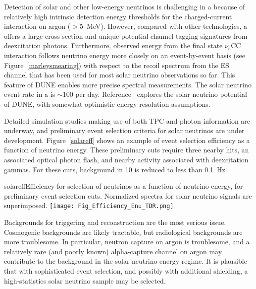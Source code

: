 Detection of solar and other low-energy neutrinos is challenging in
a  because of relatively high intrinsic detection energy thresholds for
the charged-current interaction on argon ($>$\SI{5}{\MeV}). 
However, compared with other technologies, a  offers a large
cross section and unique potential channel-tagging signatures from deexcitation
photons.  Furthermore, observed energy from the final state $\nu_e$CC
interaction follows neutrino energy more closely on an event-by-event
basis (see Figure~\ref{marleysmearing}) with respect to the recoil
spectrum from the ES channel that has been used for most solar neutrino
observations so far. This feature of DUNE enables more precise spectral measurements.
The solar neutrino event rate in a
  is $\sim$100 per day.
Reference~\cite{Capozzi:2018dat} explores the solar neutrino potential
of DUNE, with somewhat optimistic energy resolution assumptions.

Detailed simulation studies
making use of both TPC and photon information are underway, and
preliminary event selection criteria for solar neutrinos are under development.
Figure~\ref{solareff} shows an example of event selection efficiency
as a function of neutrino energy.  These preliminary cuts require three nearby
 hits, an associated optical photon flash, and nearby
 activity associated with deexcitation gammas.  For these
cuts,
background in \SI{10}{\kt} is reduced to less than \SI{0.1}{Hz}.

\begin{dunefigure}{solareff}{Efficiency for
  selection of neutrinos as a function of neutrino energy, for
  preliminary event selection cuts.
  Normalized spectra for solar neutrino signals are superimposed. }
\texttt{[image: Fig\_Efficiency\_Enu\_TDR.png]}
\end{dunefigure}

Backgrounds for triggering and reconstruction are the most
serious issue.  Cosmogenic backgrounds are likely tractable, but
radiological backgrounds are more troublesome.  In particular, neutron
capture on argon is troublesome, and a relatively rare (and poorly
known) alpha-capture channel on argon may contribute to the background
in the solar neutrino energy regime. 
It is plausible that with sophisticated event selection, and possibly
with additional shielding, a high-statistics solar neutrino sample may be selected.


